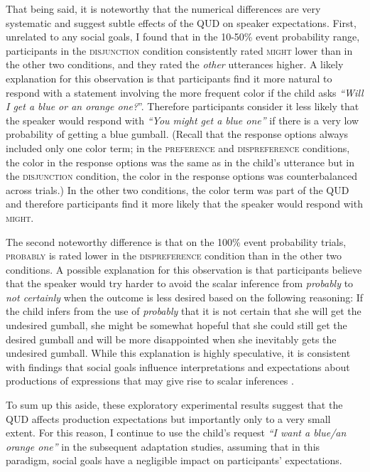 That being said, it is noteworthy that the numerical differences are very systematic and suggest subtle effects of the QUD on speaker expectations. First,
unrelated to any social goals, I found that in the 10-50\% event probability range, participants in the \textsc{disjunction} condition consistently rated \textsc{might}
 lower than in the other two conditions, and they rated the \emph{other} utterances higher. A likely explanation for this observation is that participants find it more natural to respond with a statement
involving the more frequent color if the child asks \emph{``Will I get a blue or an orange one?}''.  Therefore participants consider  it less likely that the speaker
would respond with \emph{``You might get a blue one''} if there is a very low probability of getting a blue gumball. (Recall that the response options always included
only one color term; in the \textsc{preference} and \textsc{dispreference} conditions, the color in the response options was the same as in the child's 
utterance but in the \textsc{disjunction} condition, the color in the response options was counterbalanced across trials.) In the other two conditions, the color term
was part of the QUD and therefore participants find it more likely that the speaker would respond with \textsc{might}.

The second noteworthy difference is that on the 100\% event probability trials, \textsc{probably} is rated lower in the \textsc{dispreference} condition
than in the other two conditions. A possible explanation for this observation is that participants believe that the speaker would try harder to avoid 
the scalar inference from \textit{probably} to \textit{not certainly} when the outcome is less desired based on the following reasoning:
 If the child infers from the use of \textit{probably} that it is not certain that she will get the undesired gumball, she might be somewhat hopeful
 that she could still get the desired gumball and will be more disappointed when she inevitably gets the undesired gumball. While this explanation
 is highly speculative, it is consistent with findings that social goals influence interpretations and expectations about productions of expressions
 that may give rise to scalar inferences \parencite{Bonnefon2009, Yoon2018}.
 
 To sum up this aside, these exploratory experimental results suggest that the QUD affects production expectations but importantly only to a very small
 extent. For this reason, I continue to use the child's request \emph{``I want a blue/an orange one''} in the subsequent adaptation studies, assuming that
 in this paradigm, social goals have a negligible impact on participants' expectations.


